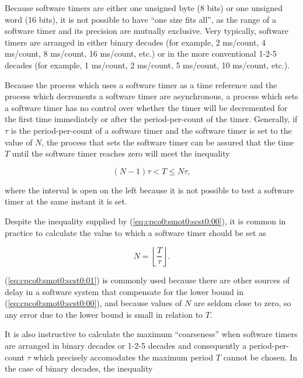 Because software timers are either one unsigned byte (8 bits) or
one unsigned word (16 bits), it is not possible to have ``one size
fits all'', as the range of a software timer and its precision
are mutually exclusive.  Very typically, software timers are arranged 
in either binary decades (for example, 2 ms/count, 4 ms/count, 
8 ms/count, 16 ms/count, etc.) or in the more conventional
1-2-5 decades (for example, 1 ms/count, 2 ms/count, 5 ms/count,
10 ms/count, etc.).

Because the process which uses a software timer as a time 
reference and the process which decrements a software timer
are asynchronous, a process which sets a software timer has no 
control over whether the timer will be decremented for the
first time immediately or after the period-per-count of the timer.
Generally, if $\tau$ is the period-per-count of a software timer and
the software timer is set to the value of $N$, the process that
sets the software timer can be assured that the time $T$ until the
software timer reaches zero will meet the inequality

\begin{equation}
\label{eq:cpco0:smot0:scst0:00}
(N-1) \tau < T \leq N \tau ,
\end{equation}

\noindent{}where the interval is open on the left because 
it is not possible to test a software timer at
the same instant it is set.

Despite the inequality supplied by 
(\ref{eq:cpco0:smot0:scst0:00}), it is common in practice to calculate
the value to which a software timer should be set as

\begin{equation}
\label{eq:cpco0:smot0:scst0:01}
N = \left\lfloor { \frac{T}{\tau} } \right\rfloor .
\end{equation}

(\ref{eq:cpco0:smot0:scst0:01}) is commonly used because there
are other sources of delay in a software system that compensate
for the lower bound in (\ref{eq:cpco0:smot0:scst0:00}), and because
values of $N$ are seldom close to zero, so any error due to the
lower bound is small in relation to $T$.

It is also instructive to calculate the maximum ``coarseness'' when 
software timers are arranged in binary decades or 1-2-5 decades
and consequently a period-per-count $\tau$ which precisely accomodates
the maximum period $T$ cannot be chosen.  In the case of binary decades,
the inequality


